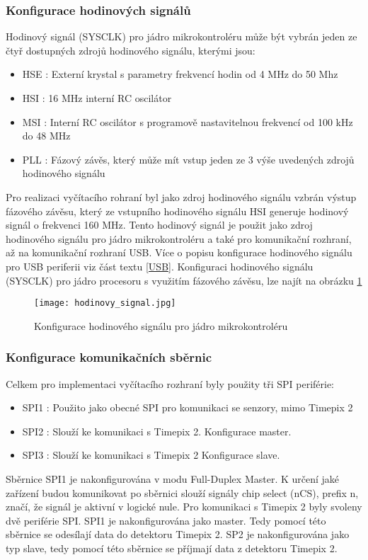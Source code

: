	\subsubsection{Konfigurace hodinových signálů} %
	Hodinový signál (SYSCLK) pro jádro mikrokontroléru může být vybrán jeden ze čtyř dostupných zdrojů hodinového signálu, kterými jsou:
	\begin{itemize}
		\setlength\itemsep{0.005em}
		\item HSE : Externí krystal s parametry frekvencí hodin od 4 MHz do 50 Mhz
		\item HSI : 16 MHz interní RC oscilátor 
		\item MSI : Interní RC oscilátor s programově nastavitelnou frekvencí od 100 kHz do 48 MHz
		\item PLL : Fázový závěs, který může mít vstup jeden ze 3 výše uvedených zdrojů hodinového signálu
	\end{itemize}
	Pro realizaci vyčítacího rohraní byl jako zdroj hodinového signálu vzbrán výstup fázového závěsu, který ze vstupního hodinového signálu HSI generuje hodinový signál o frekvenci 160 MHz. Tento hodinový signál je použit jako zdroj hodinového signálu pro jádro mikrokontroléru a také pro komunikační rozhraní, až na komunikační rozhraní USB. Více o popisu konfigurace hodinového signálu pro USB periferii viz část textu \ref{USB}. Konfiguraci hodinového signálu (SYSCLK) pro jádro procesoru s využitím fázového závěsu, lze najít na obrázku \ref{fig:hodinovy_signal} 
	\begin{figure}[h!]
		\centering
		\captionsetup{justification=centering}
		\texttt{[image: hodinovy\_signal.jpg]}
		\caption{Konfigurace hodinového signálu pro jádro mikrokontroléru} 
		\label{fig:hodinovy_signal}
	\end{figure}

	\subsubsection{Konfigurace komunikačních sběrnic}
	Celkem pro implementaci vyčítacího rozhraní byly použity tři SPI periférie:
	 \begin{itemize}
	 	\setlength\itemsep{0.005em}
	 	\item SPI1 : Použito jako obecné SPI pro komunikaci se senzory, mimo Timepix 2
	 	\item SPI2 : Slouží ke komunikaci s Timepix 2. Konfigurace master. 
	 	\item SPI3 : Slouží ke komunikaci s Timepix 2  Konfigurace slave.
	 \end{itemize}
 	Sběrnice SPI1 je nakonfigurována v modu Full-Duplex Master. K určení jaké zařízení budou komunikovat po sběrnici slouží signály chip select (nCS), prefix n, značí, že signál je aktivní v logické nule. Pro komunikaci s Timepix 2 byly svoleny dvě periférie SPI. SPI1 je nakonfigurována jako master. Tedy pomocí této sběrnice se odesílají data do detektoru Timepix 2. SP2 je nakonfigurována jako typ slave, tedy pomocí této sběrnice se příjmají data z detektoru Timepix 2.
 	
